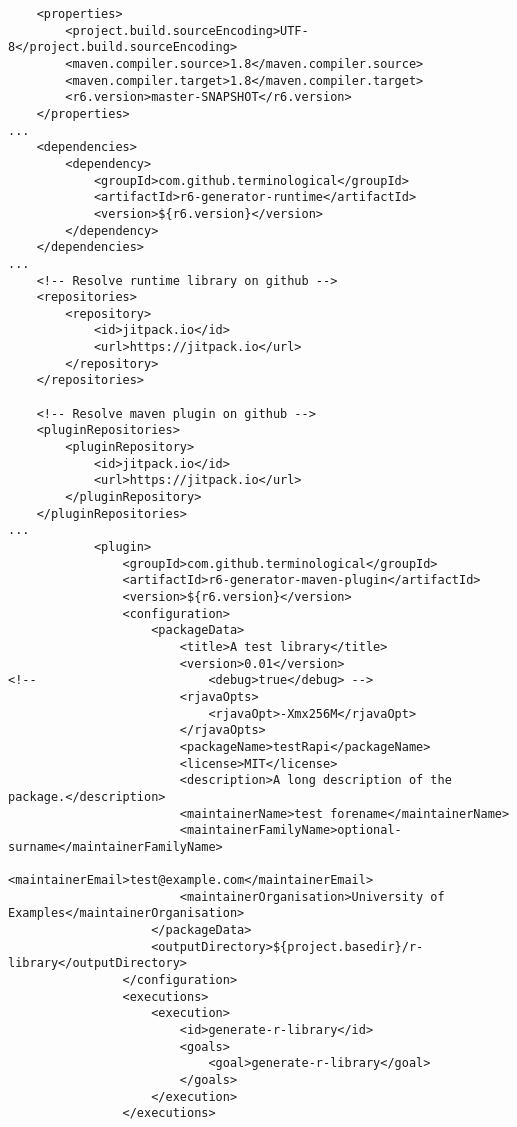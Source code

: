 \begin{verbatim}
    <properties>
        <project.build.sourceEncoding>UTF-8</project.build.sourceEncoding>
        <maven.compiler.source>1.8</maven.compiler.source>
        <maven.compiler.target>1.8</maven.compiler.target>
        <r6.version>master-SNAPSHOT</r6.version>
    </properties>
...
    <dependencies>
        <dependency>
            <groupId>com.github.terminological</groupId>
            <artifactId>r6-generator-runtime</artifactId>
            <version>${r6.version}</version>
        </dependency>
    </dependencies>
...
    <!-- Resolve runtime library on github -->
    <repositories>
        <repository>
            <id>jitpack.io</id>
            <url>https://jitpack.io</url>
        </repository>
    </repositories>

    <!-- Resolve maven plugin on github -->
    <pluginRepositories>
        <pluginRepository>
            <id>jitpack.io</id>
            <url>https://jitpack.io</url>
        </pluginRepository>
    </pluginRepositories>
...
            <plugin>
                <groupId>com.github.terminological</groupId>
                <artifactId>r6-generator-maven-plugin</artifactId>
                <version>${r6.version}</version>
                <configuration>
                    <packageData>
                        <title>A test library</title>
                        <version>0.01</version>
<!--                        <debug>true</debug> -->
                        <rjavaOpts>
                            <rjavaOpt>-Xmx256M</rjavaOpt>
                        </rjavaOpts>
                        <packageName>testRapi</packageName>
                        <license>MIT</license>
                        <description>A long description of the package.</description>
                        <maintainerName>test forename</maintainerName>
                        <maintainerFamilyName>optional-surname</maintainerFamilyName>
                        <maintainerEmail>test@example.com</maintainerEmail>
                        <maintainerOrganisation>University of Examples</maintainerOrganisation>
                    </packageData>
                    <outputDirectory>${project.basedir}/r-library</outputDirectory>
                </configuration>
                <executions>
                    <execution>
                        <id>generate-r-library</id>
                        <goals>
                            <goal>generate-r-library</goal>
                        </goals>
                    </execution>
                </executions>
\end{verbatim}

